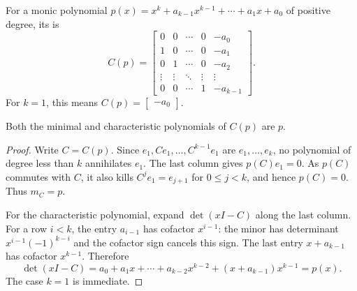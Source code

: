 \begin{Definition}
For a monic polynomial $p(x)=x^k+a_{k-1}x^{k-1}+\cdots+a_1x+a_0$ of positive degree, its  is
\begin{equation*}
C(p)=\begin{bmatrix}
0&0&\cdots&0&-a_0\\
1&0&\cdots&0&-a_1\\
0&1&\cdots&0&-a_2\\
\vdots&\vdots&\ddots&\vdots&\vdots\\
0&0&\cdots&1&-a_{k-1}
\end{bmatrix}.
\end{equation*}
For $k=1$, this means $C(p)=\begin{bmatrix}-a_0\end{bmatrix}$.
\end{Definition}

\begin{Theorem}\label{thm:Companion}
Both the minimal and characteristic polynomials of $C(p)$ are $p$.
\end{Theorem}
\begin{proof}
Write $C=C(p)$. Since $e_1,Ce_1,\ldots,C^{k-1}e_1$ are $e_1,\ldots,e_k$, no polynomial of degree less than $k$ annihilates $e_1$. The last column gives $p(C)e_1=0$. As $p(C)$ commutes with $C$, it also kills $C^je_1=e_{j+1}$ for $0\le j<k$, and hence $p(C)=0$. Thus $m_C=p$.

For the characteristic polynomial, expand $\det(xI-C)$ along the last column. For a row $i<k$, the entry $a_{i-1}$ has cofactor $x^{i-1}$: the minor has determinant $x^{i-1}(-1)^{k-i}$ and the cofactor sign cancels this sign. The last entry $x+a_{k-1}$ has cofactor $x^{k-1}$. Therefore
\begin{equation*}
\det(xI-C)=a_0+a_1x+\cdots+a_{k-2}x^{k-2}+(x+a_{k-1})x^{k-1}=p(x).
\end{equation*}
The case $k=1$ is immediate.
\end{proof}

